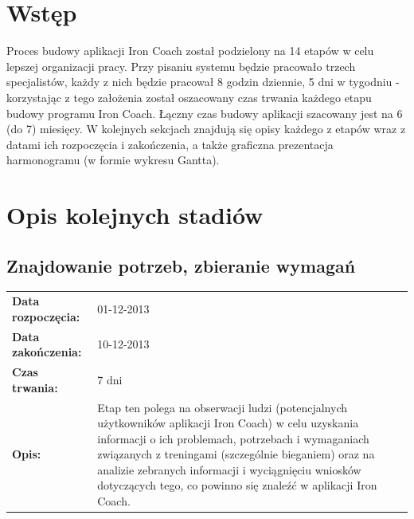 

\tableofcontents
\clearpage
\newcommand{\tabb}{\begin{tabular}{l p{8cm}}}
\renewcommand{\subsectionmark}[1]{}
\section{Wstęp}
	Proces budowy aplikacji Iron Coach został podzielony na 14 etapów w celu lepszej organizacji pracy. Przy pisaniu systemu będzie pracowało trzech specjalistów, każdy z nich będzie pracował 8 godzin dziennie, 5 dni w tygodniu - korzystając z tego założenia został oszacowany czas trwania każdego etapu budowy programu Iron Coach. Łączny czas budowy aplikacji szacowany jest na 6 (do 7) miesięcy.
	W kolejnych sekcjach znajdują się opisy każdego z etapów wraz z datami ich rozpoczęcia i zakończenia, a także graficzna prezentacja harmonogramu (w formie wykresu Gantta).
\section{Opis kolejnych stadiów}
\subsection{Znajdowanie potrzeb, zbieranie wymagań}
	\tabb
		\textbf{Data rozpoczęcia:} & 01-12-2013\\
		\textbf{Data zakończenia:} & 10-12-2013\\
		\textbf{Czas trwania:} & 7 dni\\
		\textbf{Opis:} & Etap ten polega na obserwacji ludzi (potencjalnych użytkowników aplikacji Iron Coach) w celu uzyskania informacji o ich problemach, potrzebach i wymaganiach związanych z treningami (szczególnie bieganiem) oraz na analizie zebranych informacji i wyciągnięciu wniosków dotyczących tego, co powinno się znaleźć w aplikacji Iron Coach.
	\end{tabular}
